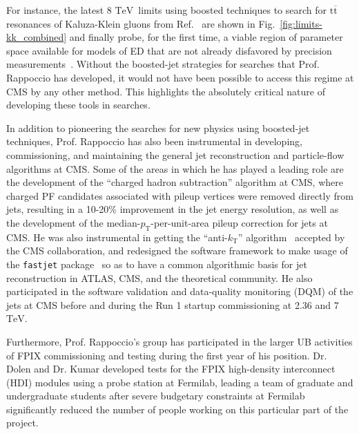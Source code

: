 \documentclass[12pt]{proposalnsf}
\newcommand{\TeV}{\ensuremath{\mathrm{TeV}}}
\newcommand{\ttbar}        {\ensuremath{\mathrm{t}\overline{\mathrm{t}}}}
\begin{document}
For instance, the latest 8 \TeV\ limits using boosted
techniques to search for $\ttbar$ resonances of Kaluza-Klein gluons
from Ref.~\cite{B2G-13-001} are shown in
Fig.~\ref{fig:limits-kk_combined} and finally probe, for
the first time, a viable region of parameter space available for
models of ED that are not already disfavored by
precision measurements~\cite{Davoudiasl:2009cd}. 
Without the boosted-jet strategies for searches that Prof. Rappoccio has
developed, it would not have been possible to access this regime at
CMS by any other method. This highlights the absolutely critical
nature of developing these tools in searches. 



In addition to pioneering the searches for new physics using
boosted-jet techniques, Prof. Rappoccio has also been instrumental in developing,
commissioning, and maintaining the general jet reconstruction and
particle-flow algorithms at CMS. Some of the areas in which
he has played a leading role are the development of the ``charged
hadron subtraction'' algorithm at CMS, where charged PF candidates
associated with pileup vertices were removed directly from
jets, resulting in a 10-20\% improvement in the jet energy
resolution, as well as the development of the
median-$p_\mathrm{T}$-per-unit-area pileup correction for jets at CMS. He was also
instrumental in getting the ``anti-$k_\mathrm{T}$'' algorithm~\cite{ktalg} accepted
by the CMS collaboration, and redesigned the software framework to
make usage of the {\tt fastjet} package~\cite{fastjet,fastjet1} so as to have a
common algorithmic basis for jet reconstruction in ATLAS, CMS, and the
theoretical community. He also
participated in the software validation and
data-quality monitoring (DQM) of the jets at CMS before and during the
Run 1 startup commissioning at 2.36 and 7 \TeV. 

Furthermore, Prof. Rappoccio's group has participated in the larger UB
activities of FPIX commissioning and testing during the first year of
his position. Dr. Dolen and Dr. Kumar developed tests for the FPIX
high-density interconnect (HDI) modules using a probe station at
Fermilab, leading a team of graduate and undergraduate students after
severe budgetary constraints at Fermilab significantly reduced the
number of people working on this particular part of the project. 
\end{document}
